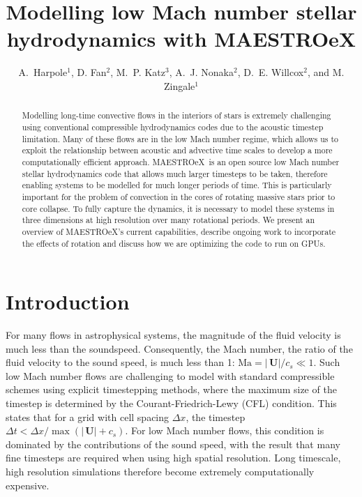 \documentclass[a4paper]{jpconf}
\newcommand{\maestroex}{{\sffamily MAESTROeX}}
\newcommand{\Ub}{{\,\bm{U}}}
\begin{document}
\title{Modelling low Mach number stellar hydrodynamics with MAESTROeX}

\author{A.~Harpole$^1$,
        D. Fan$^2$,
        M.~P. Katz$^3$,
        A.~J. Nonaka$^2$,
        D.~E. Willcox$^2$, and
        M. Zingale$^1$}

\address{$^1$Department of Physics and Astronomy, Stony Brook
  University, Stony Brook, NY 11794-3800 USA}

\address{$^2$Center for Computational Sciences and Engineering,
  Lawrence Berkeley National Lab, Berkeley, CA 94720 USA}

\address{$^3$NVIDIA Corporation, 2788 San Tomas Expressway,
  Santa Clara, CA, 95050 USA}



\begin{abstract}
Modelling long-time convective flows in the interiors of stars is extremely challenging using conventional compressible hydrodynamics codes due to the acoustic timestep limitation.
Many of these flows are in the low Mach number regime, which allows us to exploit the relationship between acoustic and advective time scales to develop a more computationally efficient approach.
\maestroex\ is an open source low Mach number stellar hydrodynamics code that allows much larger timesteps to be taken, therefore enabling systems to be modelled for much longer periods of time. This is particularly important for the problem of convection in the cores of rotating massive stars prior to core collapse. To fully capture the dynamics, it is necessary to model these systems in three dimensions at high resolution over many rotational periods.  We present an overview of \maestroex's current capabilities, describe ongoing work to incorporate the effects of rotation and discuss how we are optimizing the code to run on GPUs. 
\end{abstract}


\section{Introduction} \label{sec:intro}

For many flows in astrophysical systems, the magnitude of the fluid velocity is much less than the soundspeed. Consequently, the Mach number, the ratio of the fluid velocity to the sound speed, is much less than 1: $\textrm{Ma} = |\Ub| / c_s \ll 1$. Such low Mach number flows are challenging to model with standard compressible schemes using explicit timestepping methods, where the maximum size of the timestep is determined by the Courant-Friedrich-Lewy (CFL) condition. This states that for a grid with cell spacing $\Delta x$, the timestep $\Delta t <  \Delta x / \max(|\Ub|+c_s)$. For low Mach number flows, this condition is dominated by the contributions of the sound speed, with the result that many fine timesteps are required when using high spatial resolution. Long timescale, high resolution simulations therefore become extremely computationally expensive. 
\end{document}
